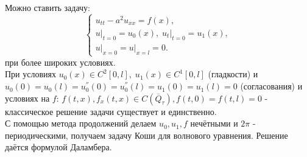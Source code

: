 Можно ставить задачу:
\begin{equation*}
	\begin{cases}
	u_{tt} - a^2u_{xx} = f(x), \\
	u\bigr|_{t = 0} = u_0(x), \; u_t\bigr|_{t = 0} = u_1(x), \\
	u\bigr|_{x = 0} = u\bigr|_{x = l} = 0.
	\end{cases}
\end{equation*}
при более широких условиях. \\
При условиях $u_0(x) \in C^2[0, l], \; u_1(x) \in C^1[0, l]$ (гладкости) и $u_0(0) = u_0(l) = u_0^{''}(0) = u_0^{''}(l) = u_1(0) = u_1(l) = 0$ (согласования) и условиях на $f$: $f(t, x), f_x(t, x) \in C(\overline{Q}_{\tau}), f(t, 0) = f(t, l) = 0$ - классическое решение задачи существует и единственно. \\
С помощью метода продолжений делаем $u_0, u_1, f$ нечётными и $2 \pi$ - периодическими, получаем задачу Коши для волнового уравнения. Решение даётся формулой Даламбера.